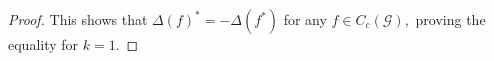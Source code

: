 \documentclass[10pt,a4paper]{amsart}
\newcommand{\Bea}{\begin{eqnarray*}}
\newcommand{\Eea}{\end{eqnarray*}}
\begin{document}
\begin{proof}
		This shows that $\Delta (f)^{\ast} = - \Delta (f^{\ast})$ for any $f \in C_c (\mathcal G),$  proving the equality for $k = 1.$ 

\end{proof}
\end{document}
